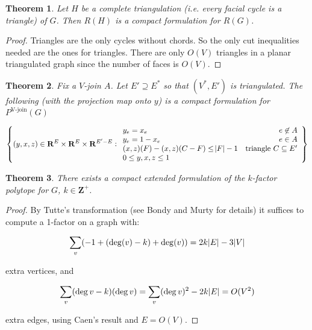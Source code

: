 \documentclass{article}
\newtheorem{theorem}{Theorem}
\begin{document}
\begin{theorem}
Let $H$ be a complete triangulation (i.e. every facial cycle is a triangle) of $G$. Then  $R(H)$ is a compact formulation for $R(G)$.
\end{theorem}
\begin{proof}
Triangles are the only cycles without chords. So
the only cut inequalities needed are the ones for triangles. 
There are only $O(V)$ triangles in a planar triangulated graph since the number of faces is $O(V)$. 
\end{proof}


\begin{theorem}
Fix a $V$-join $A$.
Let $E'\supseteq E^*$ so that $(V^*, E')$ is triangulated.
The following (with the projection map onto $y$) is a compact formulation for $P^{\text{V-join}}(G)$

$$\cbr{(y,x,z)\in\mathbf{R}^E\times\mathbf{R}^E\times\mathbf{R}^{E'-E}:
\begin{array}{lr}
y_e = x_e & e\not\in A \\
y_e = 1-x_e & e\in A \\
(x,z)(F) - (x,z)(C-F) \leq \abs{F}-1 & \text{triangle $C \subseteq E'$} \\
0 \leq y,x,z \leq 1
\end{array}
}$$
\end{theorem}

\begin{theorem}
There exists a compact extended formulation of the $k$-factor polytope for $G$,
$k\in\mathbf{Z}^+$.
\end{theorem}
\begin{proof}
By Tutte's transformation (see Bondy and Murty for details) 
it suffices to  compute a 1-factor on a graph with:

$$\sum_{v} (-1 + (\deg(v)-k) + \deg(v)) = 2k\abs{E}-3\abs{V}$$

extra vertices, and

$$\sum_{v} (\deg v - k)(\deg v) = \sum_{v}(\deg v)^2 - 2k\abs{E} = O(V^2)$$

extra edges, using Caen's result and $E = O(V)$.
\end{proof}
\end{document}
